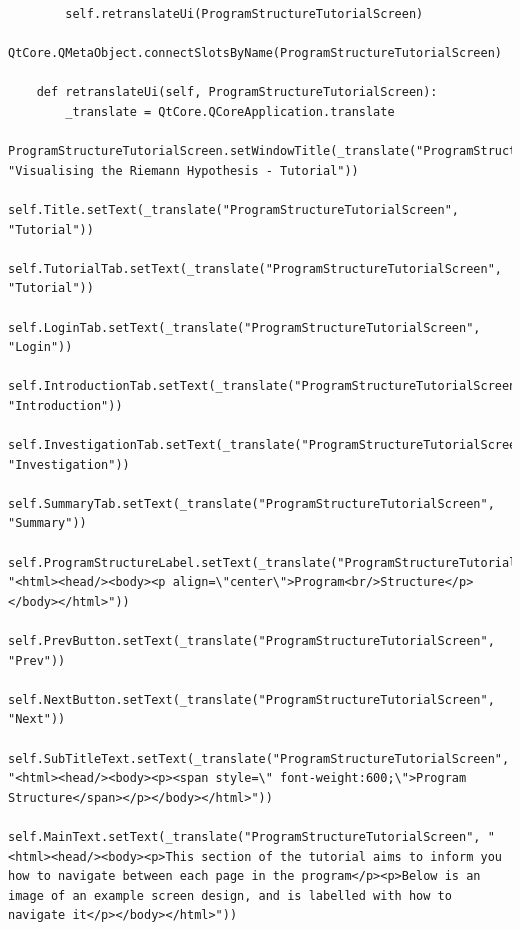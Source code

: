 \documentclass[12pt]{article}
\begin{document}
\begin{lstlisting}
        self.retranslateUi(ProgramStructureTutorialScreen)
        QtCore.QMetaObject.connectSlotsByName(ProgramStructureTutorialScreen)

    def retranslateUi(self, ProgramStructureTutorialScreen):
        _translate = QtCore.QCoreApplication.translate
        ProgramStructureTutorialScreen.setWindowTitle(_translate("ProgramStructureTutorialScreen", "Visualising the Riemann Hypothesis - Tutorial"))
        self.Title.setText(_translate("ProgramStructureTutorialScreen", "Tutorial"))
        self.TutorialTab.setText(_translate("ProgramStructureTutorialScreen", "Tutorial"))
        self.LoginTab.setText(_translate("ProgramStructureTutorialScreen", "Login"))
        self.IntroductionTab.setText(_translate("ProgramStructureTutorialScreen", "Introduction"))
        self.InvestigationTab.setText(_translate("ProgramStructureTutorialScreen", "Investigation"))
        self.SummaryTab.setText(_translate("ProgramStructureTutorialScreen", "Summary"))
        self.ProgramStructureLabel.setText(_translate("ProgramStructureTutorialScreen", "<html><head/><body><p align=\"center\">Program<br/>Structure</p></body></html>"))
        self.PrevButton.setText(_translate("ProgramStructureTutorialScreen", "Prev"))
        self.NextButton.setText(_translate("ProgramStructureTutorialScreen", "Next"))
        self.SubTitleText.setText(_translate("ProgramStructureTutorialScreen", "<html><head/><body><p><span style=\" font-weight:600;\">Program Structure</span></p></body></html>"))
        self.MainText.setText(_translate("ProgramStructureTutorialScreen", "<html><head/><body><p>This section of the tutorial aims to inform you how to navigate between each page in the program</p><p>Below is an image of an example screen design, and is labelled with how to navigate it</p></body></html>"))
\end{lstlisting}
\end{document}
